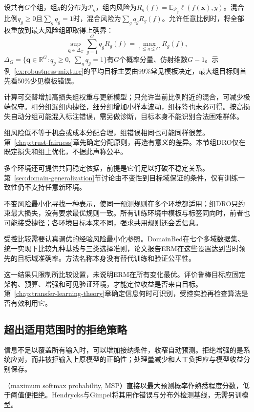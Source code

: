 设共有$G$个组，组$g$的分布为$\mathcal P_g$，组内风险为$R_g(f)=\mathbb E_{\mathcal P_g}\ell(f(\bm{x}),y)$。混合比例$q_g\geq0$且$\sum_gq_g=1$时，混合风险为$\sum_gq_gR_g(f)$。允许任意比例时，将全部权重放到最大风险组即取得上确界：
\begin{equation}
 \sup_{\bm{q}\in\Delta_G}\sum_{g=1}^{G}q_gR_g(f)
       =\max_{1\leq g\leq G}R_g(f),
 \label{eq:robustness-group-dro}
\end{equation}
$\Delta_G=\{\bm q\in\mathbb R^G:q_g\geq0,\ \sum_gq_g=1\}$有$G$个概率分量、仿射维数$G-1$。示例~\ref{ex:robustness-mixture}的平均目标主要由99\%常见模板决定，最大组目标则首先看50\%少见模板错误。

计算可交替增加高损失组权重与更新模型；只允许当前比例附近的混合，可减少极端保守。粗分组漏组内捷径，细分组增加小样本波动，组标签也未必可得。按高损失自动分组可能混入标注错误，需另做诊断，目标本身不能识别合法困难群体。

组风险低不等于机会或成本分配合理，组错误相同也可能同样很差。第~\ref{chap:trust-fairness}章先确定分配原则，再选有意义的差异。本节组DRO仅在既定损失和组上优化，不据此声称公平。

多个环境还可提供共同稳定依据，前提是它们足以打破不稳定关系。第~\ref{sec:domain-generalization}节讨论由不变性到目标域保证的条件，仅有训练一致性仍不支持任意新环境。

不变风险最小化寻找一种表示，使同一预测规则在多个环境都适用；组DRO只约束最大损失，没有要求最优规则一致。所有训练环境中模板与标签同向时，前者也可能接受捷径；各环境目标本来不同，强求共用规则还会丢信息。

受控比较需要认真调优的经验风险最小化参照。DomainBed在七个多域数据集、统一实现下比较九种基线与三类选择准则，论文报告ERM在这些设置达到当时领先的目标域准确率。方法名称本身没有替代训练和验证公平性。

这一结果只限制所比较设置，未说明ERM在所有变化最优。评价鲁棒目标应固定架构、预算、增强和可见验证环境，才能定位收益是否来自目标。第~\ref{chap:transfer-learning-theory}章确定信息何时可识别，受控实验再检查算法是否有效利用它。

\subsection{超出适用范围时的拒绝策略}
\label{sec:robustness-rejection}

信息不足以覆盖所有输入时，可以增加接纳条件，收窄自动预测。拒绝增强的是系统应对，而非被拒输入上原模型的正确性；处理量减少和人工负担应与模型收益分别保存。

（maximum softmax probability, MSP）直接以最大预测概率作熟悉程度分数，低于阈值便拒绝。Hendrycks与Gimpel将其用作错误与分布外检测基线，无需另训模型。

